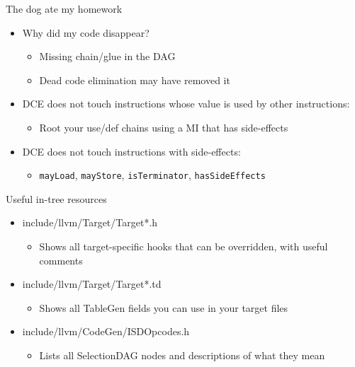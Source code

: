 \begin{frame}{The dog ate my homework}

\begin{itemize}
    \item Why did my code disappear?
    \begin{itemize}
        \item Missing chain/glue in the DAG
        \item Dead code elimination may have removed it
    \end{itemize}
    \item DCE does not touch instructions whose value is used by other instructions:
    \begin{itemize}
        \item Root your use/def chains using a MI that has side-effects
    \end{itemize}
    \item DCE does not touch instructions with side-effects:
    \begin{itemize}
        \item \texttt{mayLoad}, \texttt{mayStore}, \texttt{isTerminator}, \texttt{hasSideEffects}
    \end{itemize}
\end{itemize}

\end{frame}


\begin{frame}{Useful in-tree resources}

\begin{itemize}
    \item include/llvm/Target/Target*.h
    \begin{itemize}
        \item Shows all target-specific hooks that can be overridden, with useful comments
    \end{itemize}
    \item include/llvm/Target/Target*.td
    \begin{itemize}
        \item Shows all TableGen fields you can use in your target files
    \end{itemize}
    \item include/llvm/CodeGen/ISDOpcodes.h
    \begin{itemize}
        \item Lists all SelectionDAG nodes and descriptions of what they mean
    \end{itemize}
\end{itemize}

\end{frame}

